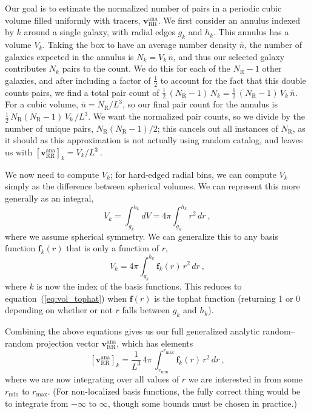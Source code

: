 \documentclass[modern]{aastex62}
\newcommand{\eqt}[1]{equation~(\ref{#1})}
\newcommand{\bld}[1]{\bm{#1}} %
\newcommand{\vv}[1]{\bld{v}_\mathrm{#1}}
\newcommand{\ff}{\bld{f}}
\newcommand{\NN}[1]{N_\mathrm{#1}}
\begin{document}
Our goal is to estimate the normalized number of pairs in a periodic cubic volume filled uniformly with tracers, $\vv{RR}^\mathrm{ana}$. 
We first consider an annulus indexed by $k$ around a single galaxy, with radial edges $g_k$ and $h_k$. 
This annulus has a volume $V_k$.
Taking the box to have an average number density $\bar{n}$, the number of galaxies expected in the annulus is $N_k = V_k \, \bar{n}$, and thus our selected galaxy contributes $N_k$ pairs to the count.   
We do this for each of the $\NN{R}-1$ other galaxies, and after including a factor of $\frac{1}{2}$ to account for the fact that this double counts pairs, we find a total pair count of $\frac{1}{2} \, (\NN{R}-1) \, N_k = \frac{1}{2} \, (\NN{R}-1) \, V_k \, \bar{n}$.
For a cubic volume, $\bar{n} = \NN{R}/L^3$, so our final pair count for the annulus is  $\frac{1}{2} \, \NN{R}(\NN{R}-1) \, V_k \, / L^3$.
We want the normalized pair counts, so we divide by the number of unique pairs, $\NN{R}(\NN{R}-1)/2$; this cancels out all instances of $\NN{R}$, as it should as this approximation is not actually using random catalog, and leaves us with $\left[ \vv{RR}^\mathrm{ana} \right]_k = V_k / L^3 ~.$

We now need to compute $V_k$; for hard-edged radial bins, we can compute $V_k$ simply as the difference between spherical volumes. 
We can represent this more generally as an integral,
\begin{equation} \label{eq:vol_tophat}
V_k = \int_{g_k}^{h_k} dV = 4\pi \int_{g_k}^{h_k} r^2 \, dr ~,
\end{equation}
where we assume spherical symmetry.
We can generalize this to any basis function $\ff_k(r)$ that is only a function of $r$,
\begin{equation}
V_k = 4\pi  \int_{g_k}^{h_k} \ff_k(r) \, r^2 \, dr ~,
\end{equation}
where $k$ is now the index of the basis functions.
This reduces to \eqt{eq:vol_tophat} when $\ff(r)$ is the tophat function (returning 1 or 0 depending on whether or not $r$ falls between $g_k$ and $h_k$).

Combining the above equations gives us our full generalized analytic random--random projection vector $\vv{RR}^\mathrm{ana}$, which has elements
\begin{equation}
\left[ \vv{RR}^\mathrm{ana} \right]_k = \frac{1}{L^3} \, 4\pi \, \int_{r_\mathrm{min}}^{r_\mathrm{max}} \ff_k(r) \, r^2 \, dr ~,
\end{equation}
where we are now integrating over all values of $r$ we are interested in from some $r_\mathrm{min}$ to $r_\mathrm{max}$.
(For non-localized basis functions, the fully correct thing would be to integrate from $-\infty$ to $\infty$, though some bounds must be chosen in practice.)
\end{document}
